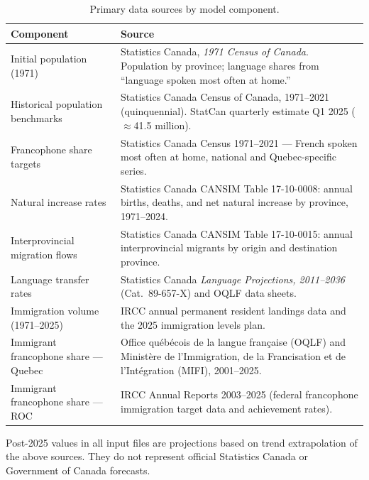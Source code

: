 \documentclass[11pt,a4paper]{article}
\begin{document}
\begin{table}[H]
\centering
\caption{Primary data sources by model component.}
\label{tab:sources}
\vspace{4pt}
\begin{tabularx}{\linewidth}{L{4cm} X}
\toprule
\textbf{Component} & \textbf{Source} \\
\midrule
Initial population (1971) &
  Statistics Canada, \textit{1971 Census of Canada}.  Population by province;
  language shares from ``language spoken most often at home.'' \\
\addlinespace
Historical population benchmarks &
  Statistics Canada Census of Canada, 1971--2021 (quinquennial).
  StatCan quarterly estimate Q1 2025 ($\approx$41.5 million). \\
\addlinespace
Francophone share targets &
  Statistics Canada Census 1971--2021 --- French spoken most often at home,
  national and Quebec-specific series. \\
\addlinespace
Natural increase rates &
  Statistics Canada CANSIM Table 17-10-0008: annual births, deaths, and net
  natural increase by province, 1971--2024. \\
\addlinespace
Interprovincial migration flows &
  Statistics Canada CANSIM Table 17-10-0015: annual interprovincial migrants
  by origin and destination province. \\
\addlinespace
Language transfer rates &
  Statistics Canada \textit{Language Projections, 2011--2036}
  (Cat.\ 89-657-X) and OQLF data sheets. \\
\addlinespace
Immigration volume (1971--2025) &
  IRCC annual permanent resident landings data and the 2025 immigration
  levels plan. \\
\addlinespace
Immigrant francophone share --- Quebec &
  Office qu\'{e}b\'{e}cois de la langue fran\c{c}aise (OQLF) and
  Minist\`{e}re de l'Immigration, de la Francisation et de l'Int\'{e}gration
  (MIFI), 2001--2025. \\
\addlinespace
Immigrant francophone share --- ROC &
  IRCC Annual Reports 2003--2025 (federal francophone immigration target
  data and achievement rates). \\
\bottomrule
\end{tabularx}
\end{table}

Post-2025 values in all input files are projections based on trend
extrapolation of the above sources.  They do not represent official Statistics
Canada or Government of Canada forecasts.
\end{document}
